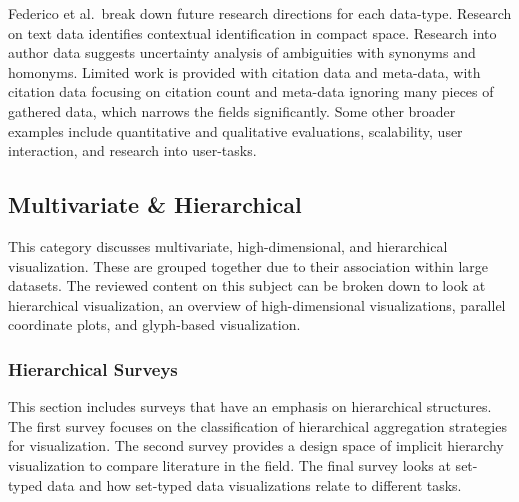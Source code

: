 %
%

Federico et al.\ break down future research directions for each data-type. Research on text data identifies contextual identification in compact space. Research into author data suggests uncertainty analysis of ambiguities with synonyms and homonyms. Limited work is provided with citation data and meta-data, with citation data focusing on citation count and meta-data ignoring many pieces of gathered data, which narrows the fields significantly. Some other broader examples include quantitative and qualitative evaluations, scalability, user interaction, and research into user-tasks.


\subsection{Multivariate \& Hierarchical}
This category discusses multivariate, high-dimensional, and hierarchical visualization. These are grouped together due to their association within large datasets. The reviewed content on this subject can be broken down to look at hierarchical visualization, an overview of high-dimensional visualizations, parallel coordinate plots, and glyph-based visualization.
\subsubsection{Hierarchical Surveys}
This section includes surveys that have an emphasis on hierarchical structures. The first survey focuses on the classification of hierarchical aggregation strategies for visualization. The second survey provides a design space of implicit hierarchy visualization to compare literature in the field. The final survey looks at set-typed data and how set-typed data visualizations relate to different tasks.


